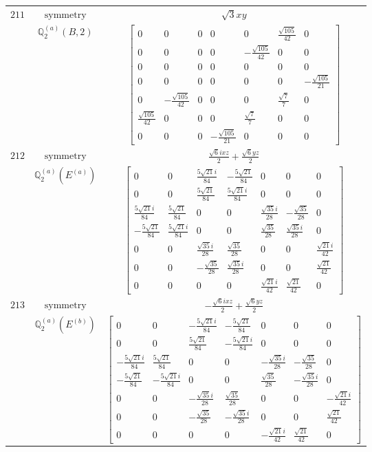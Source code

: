 \documentclass[fleqn,8pt,landscape]{jsarticle}
\begin{document}
\begin{longtable}{ccc}
$ 211 $ & $ \text{symmetry} $ & $ \sqrt{3} x y $ \\
$  $ & $ \mathbb{Q}_{2}^{(a)}(B,2) $ & $ \begin{bmatrix} 0 & 0 & 0 & 0 & 0 & \frac{\sqrt{105}}{42} & 0 \\ 0 & 0 & 0 & 0 & - \frac{\sqrt{105}}{42} & 0 & 0 \\ 0 & 0 & 0 & 0 & 0 & 0 & 0 \\ 0 & 0 & 0 & 0 & 0 & 0 & - \frac{\sqrt{105}}{21} \\ 0 & - \frac{\sqrt{105}}{42} & 0 & 0 & 0 & \frac{\sqrt{7}}{7} & 0 \\ \frac{\sqrt{105}}{42} & 0 & 0 & 0 & \frac{\sqrt{7}}{7} & 0 & 0 \\ 0 & 0 & 0 & - \frac{\sqrt{105}}{21} & 0 & 0 & 0 \end{bmatrix} $ \\ \hline
$ 212 $ & $ \text{symmetry} $ & $ \frac{\sqrt{6} i x z}{2} + \frac{\sqrt{6} y z}{2} $ \\
$  $ & $ \mathbb{Q}_{2}^{(a)}(E^{(a)}) $ & $ \begin{bmatrix} 0 & 0 & \frac{5 \sqrt{21} i}{84} & - \frac{5 \sqrt{21}}{84} & 0 & 0 & 0 \\ 0 & 0 & \frac{5 \sqrt{21}}{84} & \frac{5 \sqrt{21} i}{84} & 0 & 0 & 0 \\ \frac{5 \sqrt{21} i}{84} & \frac{5 \sqrt{21}}{84} & 0 & 0 & \frac{\sqrt{35} i}{28} & - \frac{\sqrt{35}}{28} & 0 \\ - \frac{5 \sqrt{21}}{84} & \frac{5 \sqrt{21} i}{84} & 0 & 0 & \frac{\sqrt{35}}{28} & \frac{\sqrt{35} i}{28} & 0 \\ 0 & 0 & \frac{\sqrt{35} i}{28} & \frac{\sqrt{35}}{28} & 0 & 0 & \frac{\sqrt{21} i}{42} \\ 0 & 0 & - \frac{\sqrt{35}}{28} & \frac{\sqrt{35} i}{28} & 0 & 0 & \frac{\sqrt{21}}{42} \\ 0 & 0 & 0 & 0 & \frac{\sqrt{21} i}{42} & \frac{\sqrt{21}}{42} & 0 \end{bmatrix} $ \\ \hline
$ 213 $ & $ \text{symmetry} $ & $ - \frac{\sqrt{6} i x z}{2} + \frac{\sqrt{6} y z}{2} $ \\
$  $ & $ \mathbb{Q}_{2}^{(a)}(E^{(b)}) $ & $ \begin{bmatrix} 0 & 0 & - \frac{5 \sqrt{21} i}{84} & - \frac{5 \sqrt{21}}{84} & 0 & 0 & 0 \\ 0 & 0 & \frac{5 \sqrt{21}}{84} & - \frac{5 \sqrt{21} i}{84} & 0 & 0 & 0 \\ - \frac{5 \sqrt{21} i}{84} & \frac{5 \sqrt{21}}{84} & 0 & 0 & - \frac{\sqrt{35} i}{28} & - \frac{\sqrt{35}}{28} & 0 \\ - \frac{5 \sqrt{21}}{84} & - \frac{5 \sqrt{21} i}{84} & 0 & 0 & \frac{\sqrt{35}}{28} & - \frac{\sqrt{35} i}{28} & 0 \\ 0 & 0 & - \frac{\sqrt{35} i}{28} & \frac{\sqrt{35}}{28} & 0 & 0 & - \frac{\sqrt{21} i}{42} \\ 0 & 0 & - \frac{\sqrt{35}}{28} & - \frac{\sqrt{35} i}{28} & 0 & 0 & \frac{\sqrt{21}}{42} \\ 0 & 0 & 0 & 0 & - \frac{\sqrt{21} i}{42} & \frac{\sqrt{21}}{42} & 0 \end{bmatrix} $ \\ \hline

\end{longtable}
\end{document}

